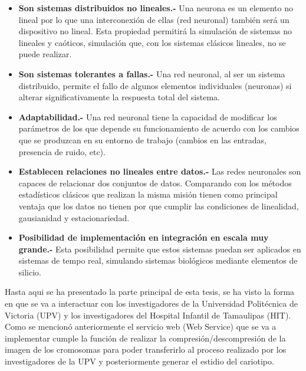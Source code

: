 \documentclass[12pt,letterpaper,titlepage]{article}
\begin{document}
\begin{itemize}
\begin{itemize}\itemsep=0pt
\item  \textbf{Son sistemas distribuidos no lineales.-} Una neurona es un elemento no lineal por lo que una interconexión	 de ellas (red neuronal) también será un dispositivo no lineal. Esta propiedad permitirá la simulación de sistemas no  lineales y caóticos, simulación que, con los sistemas clásicos lineales, no se puede realizar.
\item  \textbf{Son sistemas tolerantes a fallas.-} Una red neuronal, al ser un sistema distribuido, permite el fallo de algunos elementos individuales (neuronas) si alterar significativamente la respuesta total del sistema.
\item  \textbf{Adaptabilidad.-} Una red neuronal tiene la capacidad de modificar los parámetros de los que depende su funcionamiento de acuerdo con los cambios que se produzcan en su entorno de trabajo (cambios en las entradas, presencia de ruido, etc).
\item  \textbf{Establecen relaciones no lineales entre datos.-} Las redes neuronales son capaces de relacionar dos conjuntos de datos. Comparando con los métodos estadísticos clásicos que realizan la misma misión tienen como principal ventaja que los datos no tienen por que cumplir las condiciones de linealidad, gausianidad y estacionariedad. \cite{129}
\item  \textbf{Posibilidad de implementación en integración en escala muy grande.-} Esta posibilidad permite que estos sistemas puedan ser aplicados en sistemas de tempo real, simulando sistemas biológicos mediante elementos de silicio. \cite{130}
\end{itemize}

Hasta aqui se ha presentado la parte principal de esta tesis, se ha visto la forma en que se va a interactuar con los investigadores de la Universidad Politécnica de Victoria (UPV) y los investigadores del Hospital Infantil de Tamaulipas (HIT).\\

Como se mencionó anteriormente el servicio web (Web Service) que se va a implementar cumple la función de realizar la compresión/descompresión de la imagen de los cromosomas para poder transferirlo al proceso realizado por los investigadores de la UPV y posteriormente generar el estidio del cariotipo.





\end{itemize}
\end{document}
